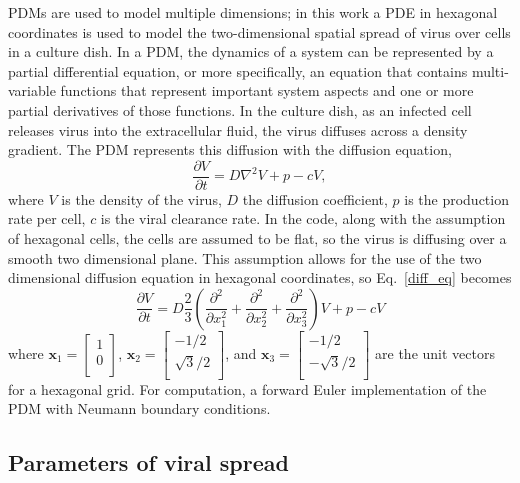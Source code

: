 PDMs are used to model multiple dimensions; in this work a PDE in hexagonal coordinates is used to model the two-dimensional spatial spread of virus over cells in a culture dish. In a PDM, the dynamics of a system can be represented by a partial differential equation, or more specifically, an equation that contains multi-variable functions that represent important system aspects and one or more partial derivatives of those functions. In the culture dish, as an infected cell releases virus into the extracellular fluid, the virus diffuses across a density gradient. The PDM represents this diffusion with the diffusion equation, 
\begin{equation}
\frac{\partial V}{\partial t}=D \nabla^{2}V + p - cV, \label{diff_eq}
\end{equation}
where $V$ is the density of the virus, $D$ the diffusion coefficient, $p$ is the production rate per cell, $c$ is the viral clearance rate. In the code, along with the assumption of hexagonal cells, the cells are assumed to be flat, so the virus is diffusing over a smooth two dimensional plane. This assumption allows for the use of the two dimensional diffusion equation in hexagonal coordinates, so Eq.\ \eqref{diff_eq} becomes 
$$\frac{\partial V}{\partial t} = D\frac{2}{3} \left (\frac{\partial^2}{\partial x^2_1}+\frac{\partial^2}{\partial x^2_2}+\frac{\partial^2}{\partial x^2_3}\right )V + p -cV$$ 
where  
$\textbf{x}_1=
\left [
    \begin{array}{c}
        1 \\
        0 \\
    \end{array}
\right ]$, 
$\textbf{x}_2=
\left [
    \begin{array}{c}
        -1/2 \\
        \sqrt{3}/2 \\
    \end{array}
\right ]$, and 
$\textbf{x}_3=
\left [
    \begin{array}{c}
        -1/2 \\
        -\sqrt{3}/2 \\
    \end{array}
\right ]$ 
are the unit vectors for a hexagonal grid. For computation, a forward Euler implementation of the PDM with Neumann boundary conditions.

\subsection{Parameters of viral spread}

